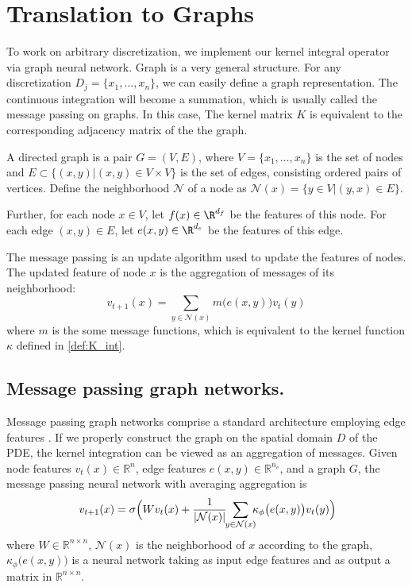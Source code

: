 


\section{Translation to Graphs}
\label{sec:graph}
To work on arbitrary discretization, we implement our kernel integral operator via graph neural network. Graph is a very general structure. For any discretization $D_j = \{x_1, \ldots, x_n\}$, we can easily define a graph representation. The continuous integration will become a summation, which is usually called the message passing on graphs. In this case, The kernel matrix $K$ is equivalent to the corresponding adjacency matrix of the the graph.

\begin{definition}[Graph]
A directed graph is a pair $G = (V, E)$, where $V = \{x_1, \ldots, x_n \}$ is the set of nodes and $E \subset \{(x,y) | (x,y) \in V \times V\}$ is the set of edges, consisting ordered pairs of vertices. Define the neighborhood $\mathcal{N}$ of a node as $\mathcal{N}(x) = \{y\in V | (y,x) \in E \}$.

Further, for each node $x \in V$, let $f(x) \in \R^{d_f}$ be the features of this node. For each edge $(x,y) \in E$, let $e(x,y) \in \R^{d_e}$ be the features of this edge.  
\end{definition}

The message passing is an update algorithm used to update the features of nodes. The updated feature of node $x$ is the aggregation of messages of its neighborhood:
\[v_{t+1}(x) = \sum_{y \in \mathcal{N}(x)} m\big(e(x,y)\big) v_t(y)\]
where $m$ is the some message functions, which is equivalent to the kernel function $\kappa$ defined in \ref{def:K_int}.

\subsection{Message passing graph networks.}
Message passing graph networks comprise a standard architecture employing edge features \citep{gilmer2017neural}. If we properly construct the graph on the spatial domain $D$ of the PDE, the kernel integration can be viewed as an aggregation of messages.
Given node features $v_t(x) \in \mathbb{R}^{n}$, edge features $e(x,y) \in \mathbb{R}^{n_e}$, and a graph $G$, the message passing neural network with averaging aggregation is
\begin{equation}\label{eq:mpnn}
v_{t+1}(x) =  \sigma\Bigl(W v_t(x) + 
\frac{1}{|\mathcal{N}(x)|} \!\!\sum_{y \in \mathcal{N}(x)} \!\!\!\kappa_{\phi}\big(e(x,y)\big) v_t(y)\Bigr)\!\!
\end{equation}
where $W \!\!\in\! \mathbb{R}^{n \times n}$, $\mathcal{N}(x)$ is the neighborhood of $x$ according to the graph, $\kappa_{\phi}\big(e(x,y)\big)$ is a neural network taking as input edge features and as output a matrix in $\mathbb{R}^{n \times n}$. \\

